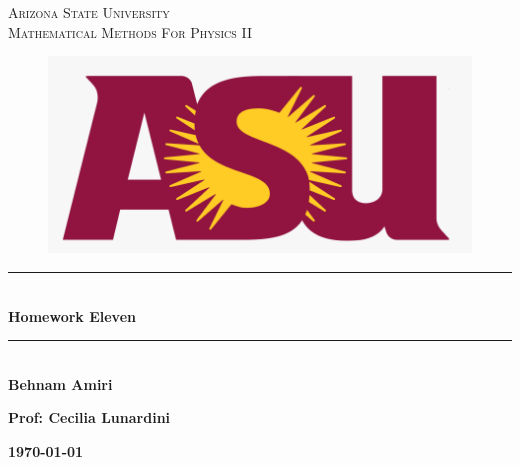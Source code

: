 \documentclass[fleqn]{article}
\begin{document}
  \begin{titlepage}

    \newcommand{\HRule}{\rule{\linewidth}{0.5mm}} %

    \center %



    \textsc{\LARGE Arizona State University}\\[1.5cm] %

    \textsc{\LARGE Mathematical Methods For Physics II }\\[1.5cm] %


    \begin{figure}
      \includegraphics[width=\linewidth]{asu.png}
    \end{figure}


    \HRule \\[0.4cm]
    { \huge \bfseries Homework Eleven}\\[0.4cm] 
    \HRule \\[1.5cm]

    \textbf{Behnam Amiri}

    \bigbreak

    \textbf{Prof: Cecilia Lunardini}

    \bigbreak


    \textbf{{\large \today}\\[2cm]}

    \vfill %

  \end{titlepage}
\end{document}
